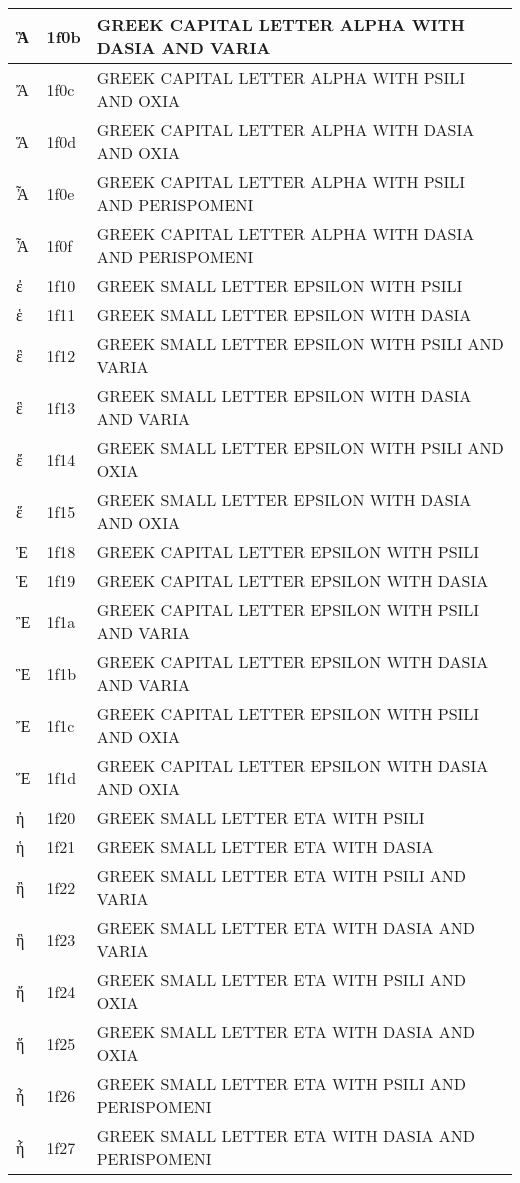 \documentclass[12pt,letterpaper,openany]{book}
\begin{document}
\begin{center}
\begin{supertabular}{|m{0.25in}|m{0.5in}|m{4in}|}
Ἃ & 1f0b & GREEK CAPITAL LETTER ALPHA WITH DASIA AND VARIA\\\hline
Ἄ & 1f0c & GREEK CAPITAL LETTER ALPHA WITH PSILI AND OXIA\\\hline
Ἅ & 1f0d & GREEK CAPITAL LETTER ALPHA WITH DASIA AND OXIA\\\hline
Ἆ & 1f0e & GREEK CAPITAL LETTER ALPHA WITH PSILI AND PERISPOMENI\\\hline
Ἇ & 1f0f & GREEK CAPITAL LETTER ALPHA WITH DASIA AND PERISPOMENI\\\hline
ἐ & 1f10 & GREEK SMALL LETTER EPSILON WITH PSILI\\\hline
ἑ & 1f11 & GREEK SMALL LETTER EPSILON WITH DASIA\\\hline
ἒ & 1f12 & GREEK SMALL LETTER EPSILON WITH PSILI AND VARIA\\\hline
ἓ & 1f13 & GREEK SMALL LETTER EPSILON WITH DASIA AND VARIA\\\hline
ἔ & 1f14 & GREEK SMALL LETTER EPSILON WITH PSILI AND OXIA\\\hline
ἕ & 1f15 & GREEK SMALL LETTER EPSILON WITH DASIA AND OXIA\\\hline
Ἐ & 1f18 & GREEK CAPITAL LETTER EPSILON WITH PSILI\\\hline
Ἑ & 1f19 & GREEK CAPITAL LETTER EPSILON WITH DASIA\\\hline
Ἒ & 1f1a & GREEK CAPITAL LETTER EPSILON WITH PSILI AND VARIA\\\hline
Ἓ & 1f1b & GREEK CAPITAL LETTER EPSILON WITH DASIA AND VARIA\\\hline
Ἔ & 1f1c & GREEK CAPITAL LETTER EPSILON WITH PSILI AND OXIA\\\hline
Ἕ & 1f1d & GREEK CAPITAL LETTER EPSILON WITH DASIA AND OXIA\\\hline
ἠ & 1f20 & GREEK SMALL LETTER ETA WITH PSILI\\\hline
ἡ & 1f21 & GREEK SMALL LETTER ETA WITH DASIA\\\hline
ἢ & 1f22 & GREEK SMALL LETTER ETA WITH PSILI AND VARIA\\\hline
ἣ & 1f23 & GREEK SMALL LETTER ETA WITH DASIA AND VARIA\\\hline
ἤ & 1f24 & GREEK SMALL LETTER ETA WITH PSILI AND OXIA\\\hline
ἥ & 1f25 & GREEK SMALL LETTER ETA WITH DASIA AND OXIA\\\hline
ἦ & 1f26 & GREEK SMALL LETTER ETA WITH PSILI AND PERISPOMENI\\\hline
ἧ & 1f27 & GREEK SMALL LETTER ETA WITH DASIA AND PERISPOMENI\\\hline

\end{supertabular}
\end{center}
\end{document}
